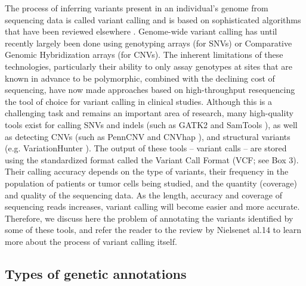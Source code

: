 The process of inferring variants present in an individual’s genome from sequencing data is called variant calling and is based on sophisticated algorithms that have been reviewed elsewhere \cite{nielsen2011genotype}. Genome-wide variant calling has until recently largely been done using genotyping arrays (for SNVs) or Comparative Genomic Hybridization arrays (for CNVs). The inherent limitations of these technologies, particularly their ability to only assay genotypes at sites that are known in advance to be polymorphic, combined with the declining cost of sequencing, have now made approaches based on high-throughput resequencing the tool of choice for variant calling in clinical studies. Although this is a challenging task and remains an important area of research, many high-quality tools exist for calling SNVs and indels (such as GATK2 and SamTools \cite{li2009sequence}), as well as detecting CNVs (such as PennCNV \cite{wang2007penncnv} and CNVhap \cite{coin2010cnvhap}), and structural variants (e.g. VariationHunter \cite{hormozdiari2011simultaneous}). The output of these tools – variant calls – are stored using the standardized format called the Variant Call Format \cite{danecek2011variant} (VCF; see Box 3). Their calling accuracy depends on the type of variants, their frequency in the population of patients or tumor cells being studied, and the quantity (coverage) and quality of the sequencing data. As the length, accuracy and coverage of sequencing reads increases, variant calling will become easier and more accurate. Therefore, we discuss here the problem of annotating the variants identified by some of these tools, and refer the reader to the review by Nielsenet al.14 to learn more about the process of variant calling itself.

\subsection{Types of genetic annotations}

